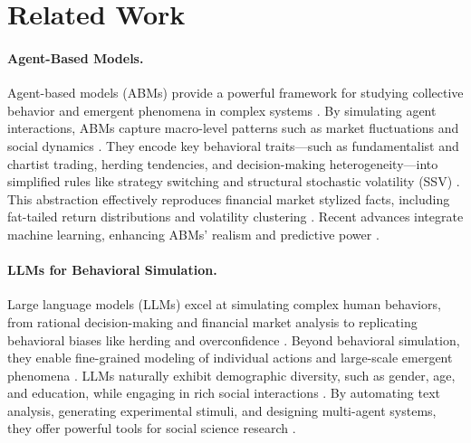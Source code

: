 \section{Related Work}
\paragraph{Agent-Based Models.}
Agent-based models (ABMs) provide a powerful framework for studying collective behavior and emergent phenomena in complex systems \cite{bonabeau2002agent,basu2015scaffolding}. By simulating agent interactions, ABMs capture macro-level patterns such as market fluctuations and social dynamics \cite{palmer1999artificial,abdollahian2013human,axtell2022agent}. They encode key behavioral traits—such as fundamentalist and chartist trading, herding tendencies, and decision-making heterogeneity—into simplified rules like strategy switching and structural stochastic volatility (SSV) \cite{cont2001empirical,franke2012structural}. This abstraction effectively reproduces financial market stylized facts, including fat-tailed return distributions and volatility clustering \cite{gaunersdorfer2007nonlinear,franke2016simple}. Recent advances integrate machine learning, enhancing ABMs' realism and predictive power \cite{georges2021market,park2023generative,reale2024interbank}.

\paragraph{LLMs for Behavioral Simulation.} 


Large language models (LLMs) excel at simulating complex human behaviors, from rational decision-making and financial market analysis to replicating behavioral biases like herding and overconfidence \cite{chen2024evaluating,yu2024fincon,fedyk2024chatgpt,yang2024oasis}. Beyond behavioral simulation, they enable fine-grained modeling of individual actions and large-scale emergent phenomena \cite{abbasiantaeb2023letllmstalksimulating,hua2024gametheoreticllmagentworkflow}. LLMs naturally exhibit demographic diversity, such as gender, age, and education, while engaging in rich social interactions \cite{fedyk2024chatgpt,eisfeldt2024ai}. By automating text analysis, generating experimental stimuli, and designing multi-agent systems, they offer powerful tools for social science research \cite{gilardi2023chatgpt,chuang2023simulating,yang2024ucfe}.